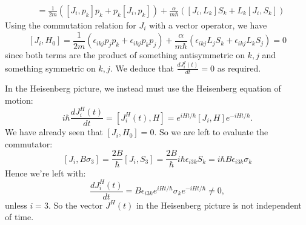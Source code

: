 \documentclass[a4paper]{scrartcl}
\begin{document}
\begin{description}
\begin{enumerate}[label=(\alph*)]
\begin{align*}
            &=\frac{1}{2 m}\left(\left[J_i, p_k\right] p_k+p_k\left[J_i, p_k\right]\right)+\frac{\alpha}{m \hbar}\left(\left[J_i, L_k\right] S_k+L_k\left[J_i, S_k\right]\right)
        \end{align*}
        Using the commutation relation for $J_i$ with a vector operator, we have
        $$
        \left[J_i, H_0\right]=\frac{1}{2 m}\left(\epsilon_{i k j} p_j p_k+\epsilon_{i k j} p_k p_j\right)+\frac{\alpha}{m \hbar}\left(\epsilon_{i k j} L_j S_k+\epsilon_{i k j} L_k S_j\right)=0
        $$
        since both terms are the product of something antisymmetric on $k, j$ and something symmetric on $k, j$. We deduce that
        $
        \frac{d J_i^I(t)}{d t}=0
        $
        as required.

        In the Heisenberg picture, we instead must use the Heisenberg equation of motion:
$$
i \hbar \frac{d J_i^H(t)}{d t}=\left[J_i^H(t), H\right]=e^{i H t / \hbar}\left[J_i, H\right] e^{-i H t / \hbar}.
$$
We have already seen that $\left[J_i, H_0\right]=0$. So we are left to evaluate the commutator:
$$
\left[J_i, B \sigma_3\right]=\frac{2 B}{\hbar}\left[J_i, S_3\right]=\frac{2 B}{\hbar} i \hbar \epsilon_{i 3 k} S_k=i \hbar B \epsilon_{i 3 k} \sigma_k
$$
Hence we're left with:
$$
\frac{d J_i^H(t)}{d t}=B \epsilon_{i 3 k} e^{i H t / \hbar} \sigma_k e^{-i H t / \hbar} \neq 0,
$$
unless $i=3$. So the vector $J^H(t)$ in the Heisenberg picture is not independent of time.
    \end{enumerate}

\end{description}







    
    
\end{document}
